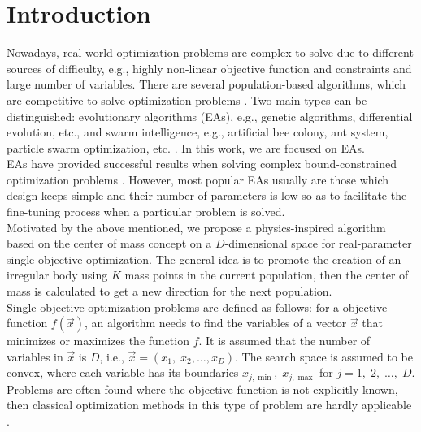 \documentclass[graybox]{svmult}
\begin{document}
\section{Introduction}
Nowadays, real-world optimization problems  are complex to solve due to 
different sources of difficulty, e.g., highly  non-linear objective function 
and constraints and large number of variables. There are several population-based 
algorithms, which are competitive to solve optimization problems \cite{easSurv}.  
Two main  types can be distinguished:  evolutionary algorithms (EAs), e.g., genetic algorithms, 
differential evolution, etc., \cite{jso2017, melanie96, ed1995} and swarm 
intelligence, e.g., artificial bee colony, ant system, particle swarm optimization, etc.
\cite{abc2005,pso1995}. In this work, we are focused on EAs.\\

EAs have provided successful results when solving complex bound-constrained 
optimization problems \cite{ed1995}.  However, most popular EAs usually are 
those which design keeps simple and their number of parameters is low so 
as to facilitate the fine-tuning process when a particular problem is solved. 
\\

Motivated by the above mentioned, we propose a  physics-inspired algorithm 
based on the center of mass concept on a $D$-dimensional space for  
real-parameter single-objective optimization. The general idea is to promote 
the creation of an irregular body using $K$ mass points in the current population, 
then the center of mass is calculated to get a new direction for the next population.\\

Single-objective optimization problems are defined as follows: for a 
objective function $f(\vec{x})$, an algorithm needs to find the variables of a vector $\vec{x}$ 
that minimizes or maximizes the function $f$. It is assumed that the number 
of variables in $\vec{x}$ is $D$, i.e., $\vec{x} = (x_1,\; x_2 , \ldots , x_D )$. 
The search space is assumed to be convex, where each variable has its  boundaries 
$x_{j, \min}, \;  x_{j, \max} $ for $j = 1,\; 2,\; \ldots,\; D$. Problems are often 
found where the objective function is not explicitly known, then classical optimization 
methods in this type of problem are hardly applicable \cite{problemas}.\\
\end{document}
